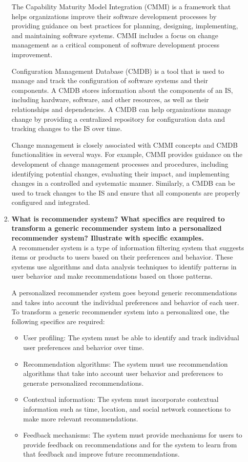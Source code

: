 \documentclass[12pt]{article}
\begin{document}
\begin{enumerate}
The Capability Maturity Model Integration (CMMI) is a framework that helps organizations improve their software development processes by providing guidance on best practices for planning, designing, implementing, and maintaining software systems. CMMI includes a focus on change management as a critical component of software development process improvement.

Configuration Management Database (CMDB) is a tool that is used to manage and track the configuration of software systems and their components. A CMDB stores information about the components of an IS, including hardware, software, and other resources, as well as their relationships and dependencies. A CMDB can help organizations manage change by providing a centralized repository for configuration data and tracking changes to the IS over time.

Change management is closely associated with CMMI concepts and CMDB functionalities in several ways. For example, CMMI provides guidance on the development of change management processes and procedures, including identifying potential changes, evaluating their impact, and implementing changes in a controlled and systematic manner. Similarly, a CMDB can be used to track changes to the IS and ensure that all components are properly configured and integrated.
    \item {\bfseries What is recommender system? What specifics are required to transform a generic recommender system into a personalized recommender system? Illustrate with specific examples.\\}
    A recommender system is a type of information filtering system that suggests items or products to users based on their preferences and behavior. These systems use algorithms and data analysis techniques to identify patterns in user behavior and make recommendations based on those patterns.

A personalized recommender system goes beyond generic recommendations and takes into account the individual preferences and behavior of each user. To transform a generic recommender system into a personalized one, the following specifics are required:
\begin{itemize}
    \item User profiling: The system must be able to identify and track individual user preferences and behavior over time.
    \item Recommendation algorithms: The system must use recommendation algorithms that take into account user behavior and preferences to generate personalized recommendations.
    \item Contextual information: The system must incorporate contextual information such as time, location, and social network connections to make more relevant recommendations.
    \item Feedback mechanisms: The system must provide mechanisms for users to provide feedback on recommendations and for the system to learn from that feedback and improve future recommendations.
\end{itemize}


\end{enumerate}
\end{document}
